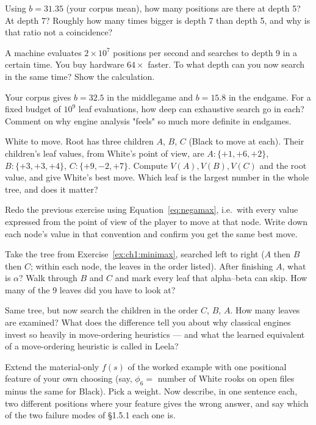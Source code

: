 \begin{exercises}

 Using $b = 31.35$ (your corpus mean), how many positions are there at
depth 5? At depth 7? Roughly how many times bigger is depth 7 than depth 5, and why is that
ratio not a coincidence?

 A machine evaluates $2\times10^{7}$ positions per second and
searches to depth 9 in a certain time. You buy hardware $64\times$ faster. To what depth can
you now search in the same time? Show the calculation.

 Your corpus gives $b = 32.5$ in the middlegame and
$b = 15.8$ in the endgame. For a fixed budget of $10^{9}$ leaf evaluations, how deep can
exhaustive search go in each? Comment on why engine analysis "feels" so much more definite
in endgames.

 White to move. Root has three children $A$, $B$, $C$ (Black to move at
each). Their children's leaf values, from White's point of view, are
$A: \{+1, +6, +2\}$, $B: \{+3, +3, +4\}$, $C: \{+9, -2, +7\}$.
Compute $V(A), V(B), V(C)$ and the root value, and give White's best move. Which leaf is the
largest number in the whole tree, and does it matter?

 Redo the previous exercise using Equation~\eqref{eq:negamax}, i.e.\ with
every value expressed from the point of view of the player to move at that node. Write down
each node's value in that convention and confirm you get the same best move.

 Take the tree from Exercise~\ref{ex:ch1:minimax}, searched
left to right ($A$ then $B$ then $C$; within each node, the leaves in the order listed).
After finishing $A$, what is $\alpha$? Walk through $B$ and $C$ and mark every leaf that
alpha--beta can skip. How many of the 9 leaves did you have to look at?

 Same tree, but now search the children in the order $C$, $B$, $A$.
How many leaves are examined? What does the difference tell you about why classical engines
invest so heavily in move-ordering heuristics --- and what the learned equivalent of a
move-ordering heuristic is called in Leela?

 Extend the material-only $f(s)$ of the worked example with
one positional feature of your own choosing (say, $\phi_6 =$ number of White rooks on open
files minus the same for Black). Pick a weight. Now describe, in one sentence each, two
different positions where your feature gives the wrong answer, and say which of the two
failure modes of §1.5.1 each one is.


\end{exercises}
